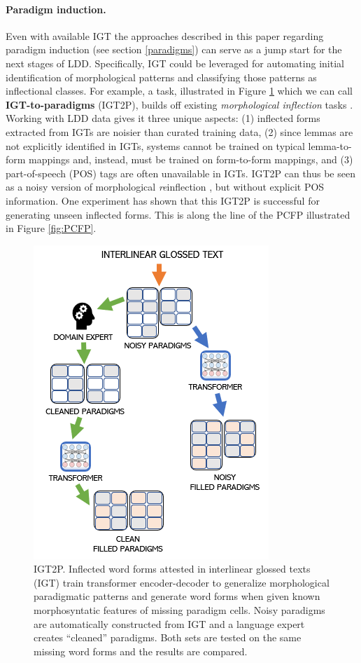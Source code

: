 \documentclass[12pt]{article}
\begin{document}
\paragraph{Paradigm induction.} Even with available IGT the approaches described in this paper regarding paradigm induction (see section \ref{paradigms}) can serve as a jump start for the next stages of LDD. Specifically, IGT could be leveraged for automating initial identification of morphological patterns and classifying those patterns as inflectional classes. For example, a task, illustrated in Figure \ref{fig:Workflow} which we can call \textbf{IGT-to-paradigms} (IGT2P), builds off existing \textit{morphological inflection} tasks \cite{yarowsky-wicentowski-2000-minimally,faruqui-etal-2016-morphological}. Working with LDD data gives it three unique aspects: (1) inflected forms extracted from IGTs are noisier than curated training data, (2) since lemmas are not explicitly identified in IGTs, systems cannot be trained on typical lemma-to-form mappings and, instead, must be trained on form-to-form mappings, and (3) part-of-speech (POS) tags are often unavailable in IGTs. IGT2P can thus be seen as a noisy version of morphological \textit{re}inflection \cite{cotterell-etal-2016-sigmorphon}, but without explicit POS information. One experiment has shown that this IGT2P is successful for generating unseen inflected forms. This is along the line of the PCFP illustrated in Figure \ref{fig:PCFP}.

\begin{figure}[t]
    \centering
    \includegraphics{IGT-Paradigm-Workflow.png}
    \caption{IGT2P. Inflected word forms attested in interlinear glossed texts (IGT) train transformer encoder-decoder to generalize morphological paradigmatic patterns and generate word forms when given known morphosyntatic features of missing paradigm cells. Noisy paradigms are automatically constructed from IGT and a language expert creates ``cleaned'' paradigms. Both sets are tested on the same missing word forms and the results are compared.}
    \label{fig:Workflow}
\end{figure}
\end{document}
